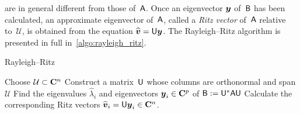 are in general different from those of~$\mathsf A$.
Once an eigenvector $\mathbf{\boldsymbol{y}}$ of~$\mathsf B$ has been calculated,
an approximate eigenvector of~$\mathsf A$,
called a \emph{Ritz vector} of~$\mathsf A$ relative to~$\mathcal U$,
is obtained from the equation $\widehat {\mathbf{\boldsymbol{v}}} = \mathsf U \mathbf{\boldsymbol{y}}$.
The Rayleigh--Ritz algorithm is presented in full in~\cref{algo:rayleigh_ritz}.
\begin{algorithm}
\caption{Rayleigh--Ritz}%
\label{algo:rayleigh_ritz}%
\begin{algorithmic}
\State Choose $\mathcal U \subset \mathbf C^n$
\State Construct a matrix~$\mathsf U$ whose columns are orthonormal and span $\mathcal U$
\State Find the eigenvalues $\widehat \lambda_i$ and eigenvectors $\mathbf{\boldsymbol{y}}_i \in \mathbf C^p$ of $\mathsf B:= \mathsf U^* \mathsf A \mathsf U$
\State Calculate the corresponding Ritz vectors $\widehat {\mathbf{\boldsymbol{v}}}_i = \mathsf U \mathbf{\boldsymbol{y}}_i \in \mathbf C^n$.
\end{algorithmic}
\end{algorithm}

